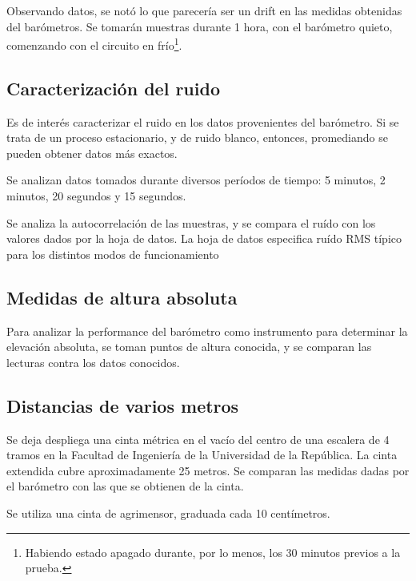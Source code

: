 \documentclass[spanish,12pt,a4paper,titlepage]{report}
\begin{document}
Observando datos, se notó lo que parecería ser un drift en las medidas obtenidas del barómetros. Se tomarán muestras durante 1 hora, con el barómetro quieto, comenzando con el circuito en frío\footnote{Habiendo estado apagado durante, por lo menos, los 30 minutos previos a la prueba.}.

\subsection{Caracterización del ruido}

Es de interés caracterizar el ruido en los datos provenientes del barómetro. Si se trata de un proceso estacionario, y de ruido blanco, entonces, promediando se pueden obtener datos más exactos.

Se analizan datos tomados durante diversos períodos de tiempo: 5 minutos, 2 minutos, 20 segundos y 15 segundos.

Se analiza la autocorrelación de las muestras, y se compara el ruído con los valores dados por la hoja de datos. La hoja de datos especifica ruído RMS típico para los distintos modos de funcionamiento

\subsection{Medidas de altura absoluta}

Para analizar la performance del barómetro como instrumento para determinar la elevación absoluta, se toman puntos de altura conocida, y se comparan las lecturas contra los datos conocidos.

\subsection{Distancias de varios metros}

Se deja despliega una cinta métrica en el vacío del centro de una escalera de 4 tramos en la Facultad de Ingeniería de la Universidad de la República. La cinta extendida cubre aproximadamente 25 metros. Se comparan las medidas dadas por el barómetro con las que se obtienen de la cinta.

Se utiliza una cinta de agrimensor, graduada cada 10 centímetros.
\end{document}
